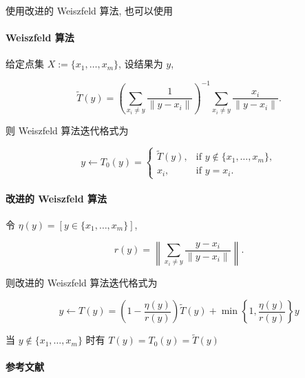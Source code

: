 使用改进的 Weiszfeld 算法, 也可以使用 

\paragraph{Weiszfeld 算法}

给定点集 \(X:=\{x_1,\dots,x_m\}\), 设结果为 \(y\),

\[
    \tilde{T}(y)=\left(\sum_{x_i\neq y} \frac{1}{\lVert y-x_i\rVert}\right)^{-1}\sum_{x_i\neq y} \frac{x_i}{\lVert y-x_i\rVert}.
\]

则 Weiszfeld 算法迭代格式为

\[
    y\gets T_0(y)=\begin{cases}
        \tilde{T}(y), &\text{if } y\notin\{x_1,\dots,x_m\},\\
        x_i,&\text{if } y=x_i.
    \end{cases}
\]

\paragraph{改进的 Weiszfeld 算法}

令 \(\eta(y)=[y\in\{x_1,\dots,x_m\}]\),

\[
    r(y)=\left\lVert\sum_{x_i\neq y} \frac{y-x_i}{\lVert y-x_i\rVert}\right\rVert.
\]

则改进的 Weiszfeld 算法迭代格式为

\[
    y\gets T(y)=\left(1-\frac{\eta(y)}{r(y)}\right)\tilde{T}(y)+\min\left\{1,\frac{\eta(y)}{r(y)}\right\}y
\]

当 \(y\notin\{x_1,\dots,x_m\}\) 时有 \(T(y)=T_0(y)=\tilde{T}(y)\)

\paragraph{参考文献} \cite{katz1974local} \cite{brimberg1992local} \cite{vardi2000multivariate}